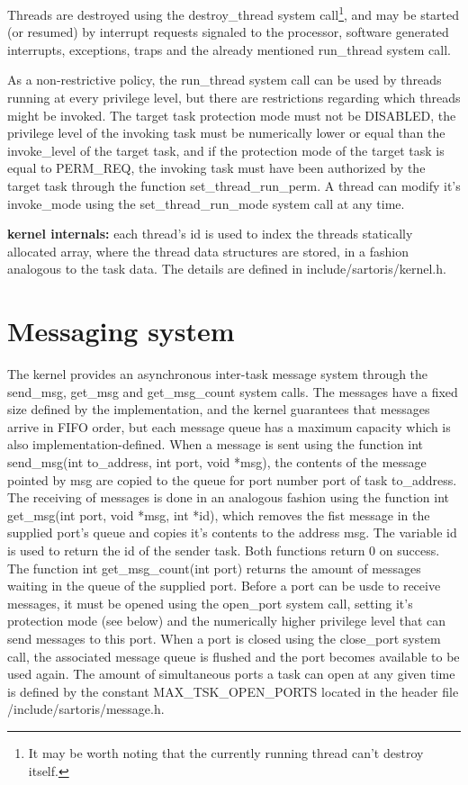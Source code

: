 \documentclass[11pt, letterpaper, twoside, english]{book}
\begin{document}
Threads are destroyed using the \textsf{destroy\_thread} system call\footnote{It may be worth noting that the currently running thread can't destroy itself.}, and may be started (or resumed) by interrupt requests signaled to the processor, software generated interrupts, exceptions, traps and the already mentioned \textsf{run\_thread} system call.

As a non-restrictive policy, the \textsf{run\_thread} system call can be used by threads running at every privilege level, but there are restrictions regarding which threads might be invoked. The target task protection mode must not be \textsf{DISABLED}, the privilege level of the invoking task must be numerically lower or equal than the \textsf{invoke\_level} of the target task, and if the protection mode of the target task is equal to \textsf{PERM\_REQ}, the invoking task must have been authorized by the target task through the function \textsf{set\_thread\_run\_perm}.
A thread can modify it's \textsf{invoke\_mode} using the \textsf{set\_thread\_run\_mode} system call at any time. 

\textbf{kernel internals:} each thread's \textsf{id} is used to index the \textsf{threads} statically allocated array, where the \textsf{thread} data structures are stored, in a fashion analogous to the task data. The details are defined in \textsf{include/sartoris/kernel.h}.
       
\section{Messaging system}
The kernel provides an asynchronous inter-task message system through the \textsf{send\_msg}, \textsf{get\_msg} and \textsf{get\_msg\_count} system calls. The messages have a fixed size defined by the implementation, and the kernel guarantees that messages arrive in FIFO order, but each message queue has a maximum capacity which is also implementation-defined. When a message is sent using the function \textsf{int send\_msg(int to\_address, int port, void *msg)}, the contents of the message pointed by \textsf{msg} are copied to the queue for port number \textsf{port} of task \textsf{to\_address}. The receiving of messages is done in an analogous fashion using the function \textsf{int get\_msg(int port, void *msg, int *id)}, which removes the fist message in the supplied \textsf{port}'s queue and copies it's contents to the address \textsf{msg}. The variable \textsf{id} is used to return the id of the sender task. Both functions return 0 on success. 
The function \textsf{int get\_msg\_count(int port)} returns the amount of messages waiting in the queue of the supplied port.
Before a port can be usde to receive messages, it must be opened using the \textsf{open\_port} system call, setting it's protection mode (see below) and the numerically higher privilege level that can send messages to this port. When a port is closed using the \textsf{close\_port} system call, the associated message queue is flushed and the port becomes available to be used again. The amount of simultaneous ports a task can open at any given time is defined by the constant \textsf{MAX\_TSK\_OPEN\_PORTS} located in the header file \textsf{/include/sartoris/message.h}. 
\end{document}
